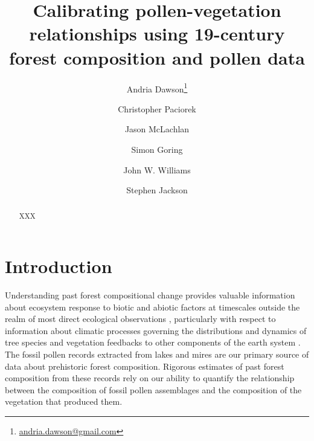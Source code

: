 \documentclass[12pt]{article}
\begin{document}
\nocite{*}

\title{Calibrating pollen-vegetation relationships using 19-century forest composition and pollen data}



\author[1]{Andria Dawson\footnote{\url{andria.dawson@gmail.com}}}
\author[1]{Christopher Paciorek}
\author[2]{Jason McLachlan}
\author[3]{Simon Goring}
\author[3]{John W. Williams}
\author[4]{Stephen Jackson}

\maketitle

\newpage
\begin{abstract}
XXX
\end{abstract}

\section{Introduction}
Understanding past forest compositional change provides valuable
information about ecosystem response to biotic and abiotic factors at
timescales outside the realm of most direct ecological observations
\citep{jackson2007looking}, particularly with respect to information
about climatic processes governing the distributions and dynamics of
tree species \citep{goring2015a, prentice1991vegetation,
  williams2009rapid, blois2013space, webb1993vegetation} and
vegetation feedbacks to other components of the earth system
\citep{matthes2015}. The fossil pollen records extracted from lakes
and mires are our primary source of data about prehistoric forest
composition. Rigorous estimates of past forest composition from these
records rely on our ability to quantify the relationship between the
composition of fossil pollen assemblages and the composition of the
vegetation that produced them.
\end{document}
